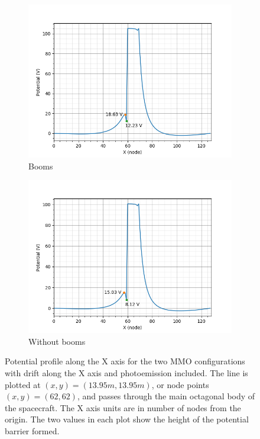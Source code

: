 
\begin{figure}[H]
  \begin{subfigure}[b]{0.6\textwidth}
  \includegraphics[width=\textwidth]{figures/MMO/posX/WB/L_posX_WB.png}
  \caption{Booms}
  \label{fig:L_posX_WB}
\end{subfigure}
\begin{subfigure}[b]{0.6\textwidth}
  \includegraphics[width=\textwidth]{figures/MMO/posX/NB/L_posX_NB.png}
  \caption{Without booms}
  \label{fig:L_posX_NB}
\end{subfigure}
\label{fig:Line_posX}
\caption{Potential profile along the X axis for the two MMO configurations with drift along the X axis and photoemission included. The line is plotted at $(x,y) = (13.95 m, 13.95 m)$, or node points $(x,y) = (62,62)$, and passes through the main octagonal body of the spacecraft. The X axis units are in number of nodes from the origin. The two values in each plot show the height of the potential barrier formed.}
\end{figure}


